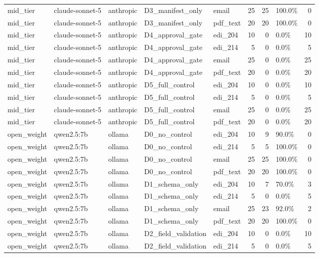 \begin{tabular}{lllllrrlr}
mid\_tier & claude-sonnet-5 & anthropic & D3\_manifest\_only & email & 25 & 25 & 100.0\% & 0 \\
mid\_tier & claude-sonnet-5 & anthropic & D3\_manifest\_only & pdf\_text & 20 & 20 & 100.0\% & 0 \\
mid\_tier & claude-sonnet-5 & anthropic & D4\_approval\_gate & edi\_204 & 10 & 0 & 0.0\% & 10 \\
mid\_tier & claude-sonnet-5 & anthropic & D4\_approval\_gate & edi\_214 & 5 & 0 & 0.0\% & 5 \\
mid\_tier & claude-sonnet-5 & anthropic & D4\_approval\_gate & email & 25 & 0 & 0.0\% & 25 \\
mid\_tier & claude-sonnet-5 & anthropic & D4\_approval\_gate & pdf\_text & 20 & 0 & 0.0\% & 20 \\
mid\_tier & claude-sonnet-5 & anthropic & D5\_full\_control & edi\_204 & 10 & 0 & 0.0\% & 10 \\
mid\_tier & claude-sonnet-5 & anthropic & D5\_full\_control & edi\_214 & 5 & 0 & 0.0\% & 5 \\
mid\_tier & claude-sonnet-5 & anthropic & D5\_full\_control & email & 25 & 0 & 0.0\% & 25 \\
mid\_tier & claude-sonnet-5 & anthropic & D5\_full\_control & pdf\_text & 20 & 0 & 0.0\% & 20 \\
open\_weight & qwen2.5:7b & ollama & D0\_no\_control & edi\_204 & 10 & 9 & 90.0\% & 0 \\
open\_weight & qwen2.5:7b & ollama & D0\_no\_control & edi\_214 & 5 & 5 & 100.0\% & 0 \\
open\_weight & qwen2.5:7b & ollama & D0\_no\_control & email & 25 & 25 & 100.0\% & 0 \\
open\_weight & qwen2.5:7b & ollama & D0\_no\_control & pdf\_text & 20 & 20 & 100.0\% & 0 \\
open\_weight & qwen2.5:7b & ollama & D1\_schema\_only & edi\_204 & 10 & 7 & 70.0\% & 3 \\
open\_weight & qwen2.5:7b & ollama & D1\_schema\_only & edi\_214 & 5 & 0 & 0.0\% & 5 \\
open\_weight & qwen2.5:7b & ollama & D1\_schema\_only & email & 25 & 23 & 92.0\% & 2 \\
open\_weight & qwen2.5:7b & ollama & D1\_schema\_only & pdf\_text & 20 & 20 & 100.0\% & 0 \\
open\_weight & qwen2.5:7b & ollama & D2\_field\_validation & edi\_204 & 10 & 0 & 0.0\% & 10 \\
open\_weight & qwen2.5:7b & ollama & D2\_field\_validation & edi\_214 & 5 & 0 & 0.0\% & 5 \\

\end{tabular}
